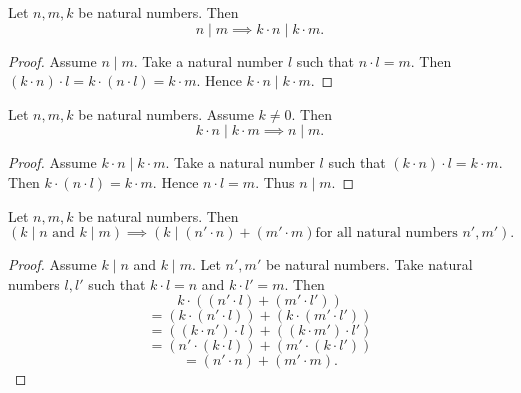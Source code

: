 \documentclass[../arithmetic.tex]{subfiles}
\begin{document}
  \begin{forthel}
    \begin{proposition}
      Let $n, m, k$ be natural numbers.
      Then \[ n \mid m \implies k \cdot n \mid k \cdot m. \]
    \end{proposition}
    \begin{proof}
      Assume $n \mid m$.
      Take a natural number $l$ such that $n \cdot l = m$.
      Then $(k \cdot n) \cdot l
        = k \cdot (n \cdot l)
        = k \cdot m$.
      Hence $k \cdot n \mid k \cdot m$.
    \end{proof}
  \end{forthel}

  \begin{forthel}
    \begin{proposition}
      Let $n, m, k$ be natural numbers.
      Assume $k \neq 0$.
      Then \[ k \cdot n \mid k \cdot m \implies n \mid m. \]
    \end{proposition}
    \begin{proof}
      Assume $k \cdot n \mid k \cdot m$.
      Take a natural number $l$ such that $(k \cdot n) \cdot l = k \cdot m$.
      Then $k \cdot (n \cdot l) = k \cdot m$.
      Hence $n \cdot l = m$.
      Thus $n \mid m$.
    \end{proof}
  \end{forthel}

  \begin{forthel}
    \begin{proposition}
      Let $n, m, k$ be natural numbers.
      Then \[ (\text{$k \mid n$ and $k \mid m$}) \implies
      (\text{$k \mid (n' \cdot n) \plus (m' \cdot m)$
      for all natural numbers $n', m'$}). \]
    \end{proposition}
    \begin{proof}
      Assume $k \mid n$ and $k \mid m$.
      Let $n', m'$ be natural numbers.
      Take natural numbers $l,l'$ such that $k \cdot l = n$ and $k \cdot l' = m$.
      Then
      \[  k \cdot ((n' \cdot l) \plus (m' \cdot l'))                \]
      \[    = (k \cdot (n' \cdot l)) \plus (k \cdot (m' \cdot l'))  \]
      \[    = ((k \cdot n') \cdot l) \plus ((k \cdot m') \cdot l')  \]
      \[    = (n' \cdot (k \cdot l)) \plus (m' \cdot (k \cdot l'))  \]
      \[    = (n' \cdot n) \plus (m' \cdot m).                      \]
    \end{proof}
  \end{forthel}
\end{document}
